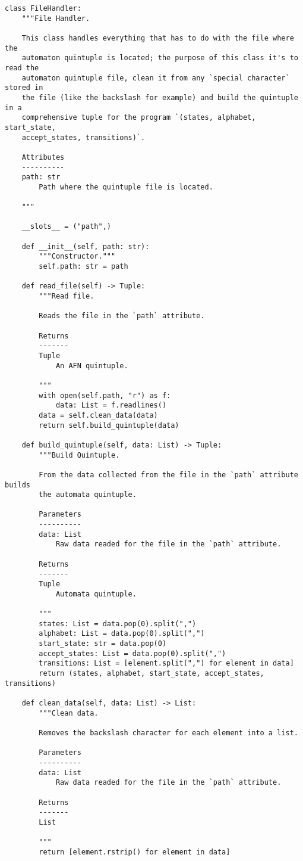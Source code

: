 \begin{lstlisting}
class FileHandler:
    """File Handler.

    This class handles everything that has to do with the file where the
    automaton quintuple is located; the purpose of this class it's to read the
    automaton quintuple file, clean it from any `special character` stored in
    the file (like the backslash for example) and build the quintuple in a
    comprehensive tuple for the program `(states, alphabet, start_state,
    accept_states, transitions)`.

    Attributes
    ----------
    path: str
        Path where the quintuple file is located.

    """

    __slots__ = ("path",)

    def __init__(self, path: str):
        """Constructor."""
        self.path: str = path

    def read_file(self) -> Tuple:
        """Read file.

        Reads the file in the `path` attribute.

        Returns
        -------
        Tuple
            An AFN quintuple.

        """
        with open(self.path, "r") as f:
            data: List = f.readlines()
        data = self.clean_data(data)
        return self.build_quintuple(data)

    def build_quintuple(self, data: List) -> Tuple:
        """Build Quintuple.

        From the data collected from the file in the `path` attribute builds
        the automata quintuple.

        Parameters
        ----------
        data: List
            Raw data readed for the file in the `path` attribute.

        Returns
        -------
        Tuple
            Automata quintuple.

        """
        states: List = data.pop(0).split(",")
        alphabet: List = data.pop(0).split(",")
        start_state: str = data.pop(0)
        accept_states: List = data.pop(0).split(",")
        transitions: List = [element.split(",") for element in data]
        return (states, alphabet, start_state, accept_states, transitions)

    def clean_data(self, data: List) -> List:
        """Clean data.

        Removes the backslash character for each element into a list.

        Parameters
        ----------
        data: List
            Raw data readed for the file in the `path` attribute.

        Returns
        -------
        List

        """
        return [element.rstrip() for element in data]
\end{lstlisting}


